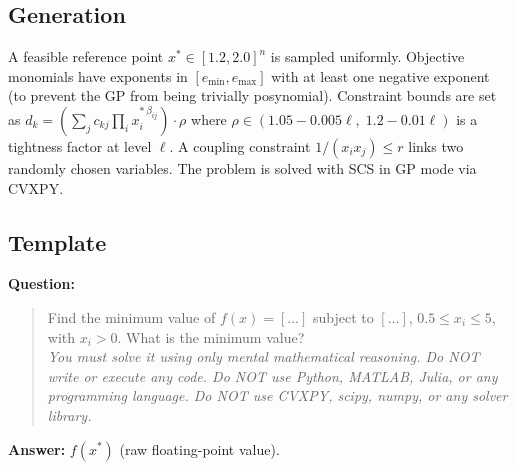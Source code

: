 \documentclass[12pt]{article}
\begin{document}
\subsection{Generation}

A feasible reference point $x^* \in [1.2, 2.0]^n$ is sampled uniformly.
Objective monomials have exponents in $[e_{\min}, e_{\max}]$ with at least one negative exponent
(to prevent the GP from being trivially posynomial).
Constraint bounds are set as $d_k = \left(\sum_j c_{kj} \prod_i x_i^{*\,\beta_{ij}}\right) \cdot \rho$
where $\rho \in (1.05 - 0.005\ell,\; 1.2 - 0.01\ell)$ is a tightness factor at level $\ell$.
A coupling constraint $1/(x_i x_j) \leq r$ links two randomly chosen variables.
The problem is solved with SCS in GP mode via CVXPY.

\subsection{Template}

\vspace{6pt}
\noindent\textbf{Question:}
\begin{quote}
Find the minimum value of $f(x) = [\ldots]$ subject to $[\ldots]$,
$0.5 \leq x_i \leq 5$, with $x_i > 0$.
What is the minimum value?\\[4pt]
\textit{You must solve it using only mental mathematical reasoning.
Do NOT write or execute any code.
Do NOT use Python, MATLAB, Julia, or any programming language.
Do NOT use CVXPY, scipy, numpy, or any solver library.}
\end{quote}

\noindent\textbf{Answer:} $f(x^*)$ (raw floating-point value).
\end{document}
